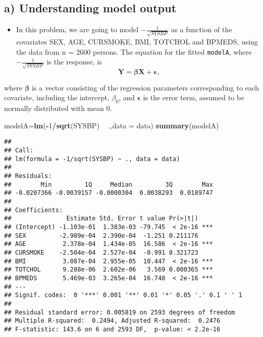 \documentclass[]{article}
\newenvironment{Shaded}{\begin{snugshade}}{\end{snugshade}}
\newcommand{\KeywordTok}[1]{\textcolor[rgb]{0.13,0.29,0.53}{\textbf{#1}}}
\newcommand{\DataTypeTok}[1]{\textcolor[rgb]{0.13,0.29,0.53}{#1}}
\newcommand{\DecValTok}[1]{\textcolor[rgb]{0.00,0.00,0.81}{#1}}
\newcommand{\StringTok}[1]{\textcolor[rgb]{0.31,0.60,0.02}{#1}}
\newcommand{\OperatorTok}[1]{\textcolor[rgb]{0.81,0.36,0.00}{\textbf{#1}}}
\newcommand{\NormalTok}[1]{#1}
\providecommand{\tightlist}{%
  \setlength{\itemsep}{0pt}\setlength{\parskip}{0pt}}
\begin{document}
\subsection{a) Understanding model
output}\label{a-understanding-model-output}

\begin{itemize}
\tightlist
\item
  In this problem, we are going to model \(-\frac{1}{\sqrt{SYSBP}}\) as
  a function of the covariates SEX, AGE, CURSMOKE, BMI, TOTCHOL and
  BPMEDS, using the data from n = 2600 persons. The equation for the
  fitted \texttt{modelA}, where \(-\frac{1}{\sqrt{SYSBP}}\) is the
  response, is
  \[\boldsymbol{Y}=\boldsymbol{\beta}\boldsymbol{X}+\boldsymbol{\epsilon},\]
\end{itemize}

where \(\boldsymbol{\beta}\) is a vector consisting of the regression
parameters corresponding to each covariate, including the intercept,
\(\beta_0\), and \(\boldsymbol{\epsilon}\) is the error term, assumed to
be normally distributed with mean 0.

\begin{Shaded}
\begin{Highlighting}[]
\NormalTok{modelA=}\KeywordTok{lm}\NormalTok{(}\OperatorTok{-}\DecValTok{1}\OperatorTok{/}\KeywordTok{sqrt}\NormalTok{(SYSBP) }\OperatorTok{~}\StringTok{ }\NormalTok{.,}\DataTypeTok{data =}\NormalTok{ data)}
\KeywordTok{summary}\NormalTok{(modelA)}
\end{Highlighting}
\end{Shaded}

\begin{verbatim}
## 
## Call:
## lm(formula = -1/sqrt(SYSBP) ~ ., data = data)
## 
## Residuals:
##        Min         1Q     Median         3Q        Max 
## -0.0207366 -0.0039157 -0.0000304  0.0038293  0.0189747 
## 
## Coefficients:
##               Estimate Std. Error t value Pr(>|t|)    
## (Intercept) -1.103e-01  1.383e-03 -79.745  < 2e-16 ***
## SEX         -2.989e-04  2.390e-04  -1.251 0.211176    
## AGE          2.378e-04  1.434e-05  16.586  < 2e-16 ***
## CURSMOKE    -2.504e-04  2.527e-04  -0.991 0.321723    
## BMI          3.087e-04  2.955e-05  10.447  < 2e-16 ***
## TOTCHOL      9.288e-06  2.602e-06   3.569 0.000365 ***
## BPMEDS       5.469e-03  3.265e-04  16.748  < 2e-16 ***
## ---
## Signif. codes:  0 '***' 0.001 '**' 0.01 '*' 0.05 '.' 0.1 ' ' 1
## 
## Residual standard error: 0.005819 on 2593 degrees of freedom
## Multiple R-squared:  0.2494, Adjusted R-squared:  0.2476 
## F-statistic: 143.6 on 6 and 2593 DF,  p-value: < 2.2e-16
\end{verbatim}
\end{document}
